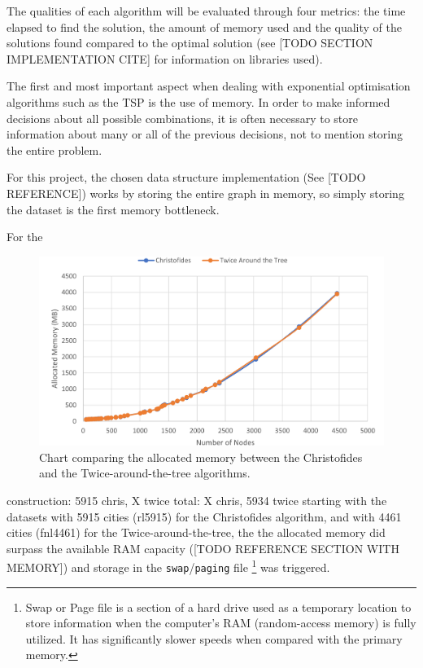 \documentclass[12pt]{article}
\begin{document}
The qualities of each algorithm will be evaluated through four metrics: the time elapsed 
to find the solution, the amount of memory used and the quality of the solutions found 
compared to the optimal solution (see [TODO SECTION IMPLEMENTATION CITE] for information 
on libraries used).

 \label{sec:exp_memory}

The first and most important aspect when dealing with exponential optimisation algorithms such as 
the TSP is the use of memory. In order to make informed decisions about all possible combinations, 
it is often necessary to store information about many or all of the previous decisions, not to 
mention storing the entire problem.

For this project, the chosen data structure implementation (See [TODO REFERENCE]) works by storing 
the entire graph in memory, so simply storing the dataset is the first memory bottleneck.

For the 

\begin{figure}[ht]
\centering
\includegraphics[height=.325\textheight]{memory_use_comparison.png}
\caption{Chart comparing the allocated memory between the Christofides and the Twice-around-the-tree algorithms.}
\label{fig:mem_use}
\end{figure}

construction: 5915 chris, X twice
total: X chris, 5934 twice
starting with the datasets with 5915 cities (rl5915) for the Christofides algorithm, 
and with 4461 cities (fnl4461) for the Twice-around-the-tree, the the allocated memory did surpass 
the available RAM capacity ([TODO REFERENCE SECTION WITH MEMORY]) and storage in the \texttt{swap}/\texttt{paging} 
file 
\footnote{Swap or Page file is a section of a hard drive used as a temporary location to store information 
when the computer's RAM (random-access memory) is fully utilized. It has significantly slower speeds when 
compared with the primary memory.} 
was triggered.
\end{document}
